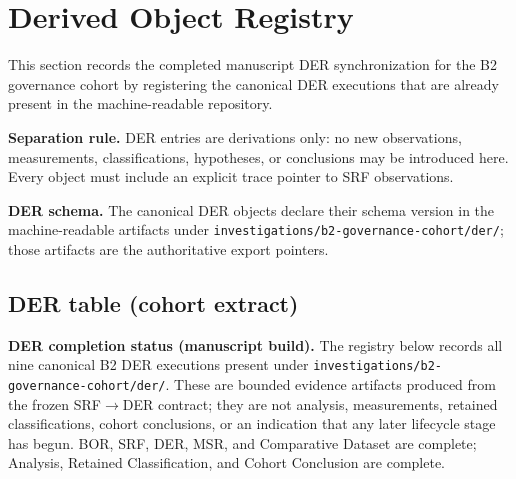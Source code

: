 \section{Derived Object Registry}
\label{sec:der}
This section records the completed manuscript DER synchronization for the B2 governance cohort by registering the canonical DER executions that are already present in the machine-readable repository.

\textbf{Separation rule.} DER entries are derivations only: no new observations, measurements, classifications, hypotheses, or conclusions may be introduced here. Every object must include an explicit trace pointer to SRF observations.

\textbf{DER schema.} The canonical DER objects declare their schema version in the machine-readable artifacts under \texttt{investigations/b2-governance-cohort/der/}; those artifacts are the authoritative export pointers.

\subsection{DER table (cohort extract)}
\textbf{DER completion status (manuscript build).} The registry below records all nine canonical B2 DER executions present under \texttt{investigations/b2-governance-cohort/der/}. These are bounded evidence artifacts produced from the frozen SRF$\to$DER contract; they are not analysis, measurements, retained classifications, cohort conclusions, or an indication that any later lifecycle stage has begun. BOR, SRF, DER, MSR, and Comparative Dataset are complete; Analysis, Retained Classification, and Cohort Conclusion are complete.

